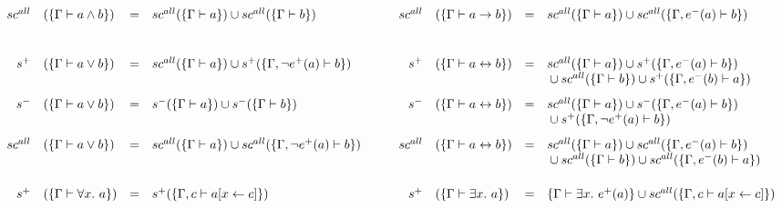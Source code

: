 \documentclass[12pt]{article}
\begin{document}
\begin{landscape}
\[\begin{array}{rlcl c rlcl}
      sc^{all} & (\{\Gamma \vdash a \land b\})           & = & sc^{all} (\{\Gamma \vdash a\}) \cup sc^{all} (\{\Gamma \vdash b\})
               & \quad                                   &
      sc^{all} & (\{\Gamma \vdash a \rightarrow b\})     & = & sc^{all} (\{\Gamma \vdash a\}) \cup sc^{all} (\{\Gamma, e^- (a) \vdash b\})                    \\
      \\[1.5em]
      s^+      & (\{\Gamma \vdash a \lor b\})            & = & sc^{all} (\{\Gamma \vdash a\}) \cup s^+ (\{\Gamma, \neg e^+(a) \vdash b\})
               & \quad                                   &
      s^+      & (\{\Gamma \vdash a \leftrightarrow b\}) & = & sc^{all} (\{\Gamma \vdash a\}) \cup s^+ (\{\Gamma, e^- (a) \vdash b\})                         \\
               &                                         &   &
               &                                         &
               &                                         &   & {} \cup sc^{all} (\{\Gamma \vdash b\}) \cup s^+ (\{\Gamma, e^-(b) \vdash a\})                  \\[.8em]

      s^-      & (\{\Gamma \vdash a \lor b\})            & = & s^- (\{\Gamma \vdash a\}) \cup s^- (\{\Gamma \vdash b\})
               & \quad                                   &
      s^-      & (\{\Gamma \vdash a \leftrightarrow b\}) & = & sc^{all} (\{\Gamma \vdash a\}) \cup s^- (\{\Gamma, e^-(a) \vdash b\})                          \\
               &                                         &   &
               &                                         &
               &                                         &   & {} \cup s^+ (\{\Gamma, \neg e^+ (a) \vdash b\})                                                \\[.8em]

      sc^{all} & (\{\Gamma \vdash a \lor b\})            & = & sc^{all} (\{\Gamma \vdash a\}) \cup sc^{all} (\{\Gamma, \neg e^+ (a)\vdash b\})
               & \quad                                   &
      sc^{all} & (\{\Gamma \vdash a \leftrightarrow b\}) & = & sc^{all} (\{\Gamma \vdash a\}) \cup sc^{all} (\{\Gamma, e^- (a) \vdash b \})                   \\
               &                                         &   &
               &                                         &
               &                                         &   & {} \cup sc^{all} (\{\Gamma \vdash b\}) \cup sc^{all} (\{\Gamma, e^- (b) \vdash a\})
      \\[1.5em]
      s^+      & (\{\Gamma \vdash \forall x.~ a\})       & = & s^+ (\{\Gamma, c \vdash a[x\leftarrow c]\})
               & \quad                                   &
      s^+      & (\{\Gamma \vdash \exists x.~ a\})       & = & \{\Gamma \vdash \exists x.~ e^+(a)\} \cup sc^{all}(\{\Gamma, c \vdash a[x\leftarrow c]\})      \\


\end{array}\]
\end{landscape}
\end{document}
